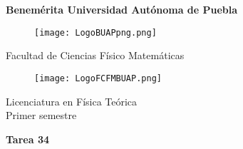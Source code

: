 \documentclass[12pt]{article}
\begin{document}
\begingroup
\begin{titlepage}
	\noindent
	\vspace{1mm}
\end{titlepage}
\endgroup

\pagestyle{empty} 
\setlength{\parindent}{0pt}
\sffamily


\begin{center} 

    \LARGE{\bf{\textsf{Benemérita Universidad Autónoma de Puebla}}} \\[0.5cm]
    
\begin{figure}[htb] \centering

    \texttt{[image: LogoBUAPpng.png]} 

\end{figure}


    \LARGE{Facultad de Ciencias Físico Matemáticas}\\[0.5cm]

\begin{figure}[htb] \centering

    \texttt{[image: LogoFCFMBUAP.png]} 
    
\end{figure} 


    \Large{Licenciatura en Física Teórica}\\[0.5cm]
    \Large{Primer semestre} 

\end{center} \vspace{0.3cm}

\begin{center}

    {\Large{\bfseries{{\textcolor{Mahogany}{Tarea 34}}}}} \\ 
    
\end{center}
\end{document}
